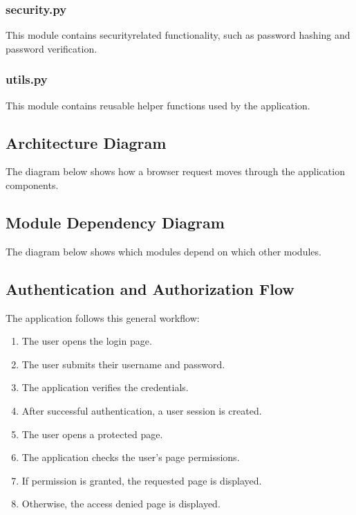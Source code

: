 \documentclass[letterpaper,10pt,english]{sphinxmanual}
\begin{document}
\subsubsection{security.py}
\label{\detokenize{architecture:security-py}}
\sphinxAtStartPar
This module contains security\sphinxhyphen{}related functionality, such as password
hashing and password verification.


\subsubsection{utils.py}
\label{\detokenize{architecture:utils-py}}
\sphinxAtStartPar
This module contains reusable helper functions used by the application.


\subsection{Architecture Diagram}
\label{\detokenize{architecture:architecture-diagram}}
\sphinxAtStartPar
The diagram below shows how a browser request moves through the
application components.


\subsection{Module Dependency Diagram}
\label{\detokenize{architecture:module-dependency-diagram}}
\sphinxAtStartPar
The diagram below shows which modules depend on which other modules.


\subsection{Authentication and Authorization Flow}
\label{\detokenize{architecture:authentication-and-authorization-flow}}
\sphinxAtStartPar
The application follows this general workflow:
\begin{enumerate}
%
\item {} 
\sphinxAtStartPar
The user opens the login page.

\item {} 
\sphinxAtStartPar
The user submits their username and password.

\item {} 
\sphinxAtStartPar
The application verifies the credentials.

\item {} 
\sphinxAtStartPar
After successful authentication, a user session is created.

\item {} 
\sphinxAtStartPar
The user opens a protected page.

\item {} 
\sphinxAtStartPar
The application checks the user’s page permissions.

\item {} 
\sphinxAtStartPar
If permission is granted, the requested page is displayed.

\item {} 
\sphinxAtStartPar
Otherwise, the access denied page is displayed.

\end{enumerate}
\end{document}
